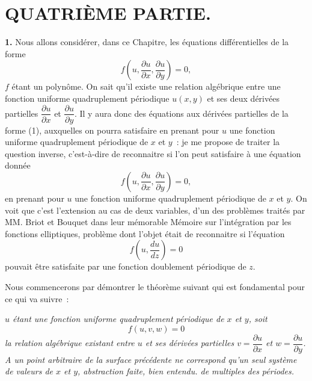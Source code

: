 \documentclass{article}
\begin{document}

\section*{QUATRIÈME PARTIE.}

\textbf{1.} Nous allons considérer, dans ce Chapitre, les équations différentielles de la forme
\[
f\left( u, \frac{\partial u}{\partial x}, \frac{\partial u}{\partial y} \right) = 0, \tag{1}
\]
$f$ étant un polynôme. On sait qu'il existe une relation algébrique entre une fonction uniforme quadruplement périodique $u(x, y)$ et ses deux dérivées partielles $\dfrac{\partial u}{\partial x}$ et $\dfrac{\partial u}{\partial y}$. Il y aura donc des équations aux dérivées partielles de la forme (1), auxquelles on pourra satisfaire en prenant pour $u$ une fonction uniforme quadruplement périodique de $x$ et $y$~: je me propose de traiter la question inverse, c'est-à-dire de reconnaitre si l'on peut satisfaire à une équation donnée
\[
f\left( u, \frac{\partial u}{\partial x}, \frac{\partial u}{\partial y} \right) = 0,
\]
en prenant pour $u$ une fonction uniforme quadruplement périodique de $x$ et $y$. On voit que c'est l'extension au cas de deux variables, d'un des problèmes traités par MM. Briot et Bouquet dans leur mémorable Mémoire sur l'intégration par les fonctions elliptiques, problème dont l'objet était de reconnaitre si l'équation
\[
f\left( u, \frac{du}{dz} \right) = 0
\]
pouvait être satisfaite par une fonction doublement périodique de $z$.

Nous commencerons par démontrer le théorème suivant qui est fondamental pour ce qui va suivre~:

\emph{$u$ étant une fonction uniforme quadruplement périodique de $x$ et $y$, soit}
\[
f(u, v, w) = 0
\]
\emph{la relation algébrique existant entre $u$ et ses dérivées partielles $v = \dfrac{\partial u}{\partial x}$ et $w = \dfrac{\partial u}{\partial y}$. A un point arbitraire de la surface précédente ne correspond qu'un seul système de valeurs de $x$ et $y$, abstraction faite, bien entendu. de multiples des périodes.}
\end{document}
